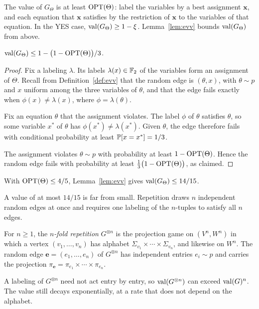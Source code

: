 The value of $G_\Theta$ is at least $\operatorname{OPT}(\Theta)$: label the variables by a best assignment $\mathbf x$, and each equation that $\mathbf x$ satisfies by the restriction of $\mathbf x$ to the variables of that equation. In the YES case, $\operatorname{val}(G_\Theta)\ge1-\xi$. Lemma~\ref{lem:evv} bounds $\operatorname{val}(G_\Theta)$ from above.

\begin{lemma}\label{lem:evv}
$\operatorname{val}(G_\Theta)\le1-\bigl(1-\operatorname{OPT}(\Theta)\bigr)/3$.
\end{lemma}

\begin{proof}
Fix a labeling $\lambda$. Its labels $\lambda(x)\in\mathbb{F}_2$ of the variables form an assignment of $\Theta$. Recall from Definition~\ref{def:evv} that the random edge is $(\theta,x)$, with $\theta\sim p$ and $x$ uniform among the three variables of $\theta$, and that the edge fails exactly when $\phi(x)\ne\lambda(x)$, where $\phi=\lambda(\theta)$.

Fix an equation $\theta$ that the assignment violates. The label $\phi$ of $\theta$ satisfies $\theta$, so some variable $x^*$ of $\theta$ has $\phi(x^*)\ne\lambda(x^*)$. Given $\theta$, the edge therefore fails with conditional probability at least $\mathbb{P}[x=x^*]=1/3$.

The assignment violates $\theta\sim p$ with probability at least $1-\operatorname{OPT}(\Theta)$. Hence the random edge fails with probability at least $\tfrac13\bigl(1-\operatorname{OPT}(\Theta)\bigr)$, as claimed.
\end{proof}

With $\operatorname{OPT}(\Theta)\le4/5$, Lemma~\ref{lem:evv} gives $\operatorname{val}(G_\Theta)\le14/15$.

A value of at most $14/15$ is far from small. Repetition draws $n$ independent random edges at once and requires one labeling of the $n$-tuples to satisfy all $n$ edges.

\begin{definition}[Repetition]\label{def:rep}
For $n\ge1$, the \emph{$n$-fold repetition} $G^{\otimes n}$ is the projection game on $(V^n,W^n)$ in which a vertex $(v_1,\dots,v_n)$ has alphabet $\Sigma_{v_1}\times\cdots\times\Sigma_{v_n}$, and likewise on $W^n$. The random edge $\mathbf e=(e_1,\dots,e_n)$ of $G^{\otimes n}$ has independent entries $e_i\sim p$ and carries the projection $\pi_{\mathbf e}=\pi_{e_1}\times\cdots\times\pi_{e_n}$.
\end{definition}

A labeling of $G^{\otimes n}$ need not act entry by entry, so $\operatorname{val}(G^{\otimes n})$ can exceed $\operatorname{val}(G)^n$. The value still decays exponentially, at a rate that does not depend on the alphabet.

